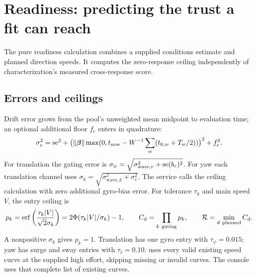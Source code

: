 \section{Readiness: predicting the trust a fit can reach}
\label{sec:ready}

The pure readiness calculation combines a supplied conditions estimate and
planned direction speeds. It computes the zero-response ceiling independently
of characterization's measured cross-response score.

\subsection{Errors and ceilings}
\label{sec:ready-sigma}

Drift error grows from the pool's unweighted mean midpoint to evaluation time;
an optional additional floor $f_e$ enters in quadrature:
\[
 \sigma_e^2=\mathrm{se}^2+\bigl(\|\bm\beta\|\max(0,t_{\mathrm{now}}-
 W^{-1}\sum_w(t_{0,w}+T_w/2))\bigr)^2+f_e^2.
\]
For translation the gating error is
$\sigma_\psi=\sqrt{\sigma_{\mathrm{wave},r}^2+\mathrm{se}(b_r)^2}$.
For yaw each translation channel uses
$\sigma_k=\sqrt{\sigma_{\mathrm{wave},k}^2+\sigma_e^2}$.
The service calls the ceiling calculation with zero additional gyro-bias error.
For tolerance $\tau_k$ and main speed $V$, the entry ceiling is
\[
 p_k=\operatorname{erf}\left(\frac{\tau_k|V|}{\sqrt2\sigma_k}\right)
     =2\Phi(\tau_k|V|/\sigma_k)-1,\qquad
 C_d=\prod_{k\ \mathrm{gating}}p_k,\qquad \Rgate=\min_{d\ \mathrm{planned}}C_d.
\]
A nonpositive $\sigma_k$ gives $p_k=1$. Translation has one gyro entry with
$\tau_\psi=0.015$; yaw has surge and sway entries with $\tau_\ell=0.10$.
 uses every valid existing speed curve at the supplied
high effort, skipping missing or invalid curves. The console uses that complete
list of existing curves.

